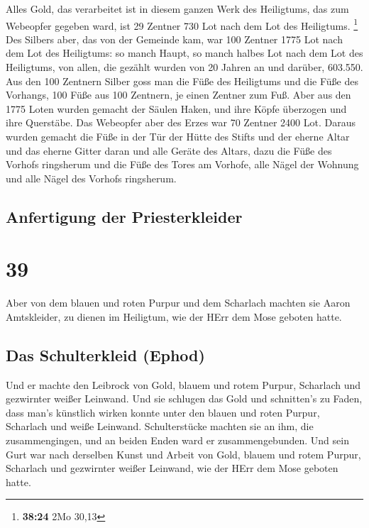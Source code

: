  Alles Gold, das verarbeitet ist in diesem ganzen Werk
des Heiligtums, das zum Webeopfer gegeben ward, ist 29 Zentner 730 Lot
nach dem Lot des Heiligtums. \footnote{\textbf{38:24} 2Mo 30,13}
 Des Silbers aber, das von der Gemeinde kam, war 100
Zentner 1775 Lot nach dem Lot des Heiligtums:  so manch
Haupt, so manch halbes Lot nach dem Lot des Heiligtums, von allen, die
gezählt wurden von 20 Jahren an und darüber, 603.550. 
Aus den 100 Zentnern Silber goss man die Füße des Heiligtums und die
Füße des Vorhangs, 100 Füße aus 100 Zentnern, je einen Zentner zum Fuß.
 Aber aus den 1775 Loten wurden gemacht der Säulen Haken,
und ihre Köpfe überzogen und ihre Querstäbe.  Das
Webeopfer aber des Erzes war 70 Zentner 2400 Lot.  Daraus
wurden gemacht die Füße in der Tür der Hütte des Stifts und der eherne
Altar und das eherne Gitter daran und alle Geräte des Altars,
 dazu die Füße des Vorhofs ringsherum und die Füße des
Tores am Vorhofe, alle Nägel der Wohnung und alle Nägel des Vorhofs
ringsherum.

\hypertarget{anfertigung-der-priesterkleider}{%
\subsection{Anfertigung der
Priesterkleider}\label{anfertigung-der-priesterkleider}}

\hypertarget{section-38}{%
\section{39}\label{section-38}}

 Aber von dem blauen und roten Purpur und dem Scharlach
machten sie Aaron Amtskleider, zu dienen im Heiligtum, wie der HErr dem
Mose geboten hatte.

\hypertarget{das-schulterkleid-ephod-1}{%
\subsection{Das Schulterkleid (Ephod)}\label{das-schulterkleid-ephod-1}}

 Und er machte den Leibrock von Gold, blauem und rotem
Purpur, Scharlach und gezwirnter weißer Leinwand.  Und sie
schlugen das Gold und schnitten's zu Faden, dass man's künstlich wirken
konnte unter den blauen und roten Purpur, Scharlach und weiße Leinwand.
 Schulterstücke machten sie an ihm, die zusammengingen,
und an beiden Enden ward er zusammengebunden.  Und sein
Gurt war nach derselben Kunst und Arbeit von Gold, blauem und rotem
Purpur, Scharlach und gezwirnter weißer Leinwand, wie der HErr dem Mose
geboten hatte.

